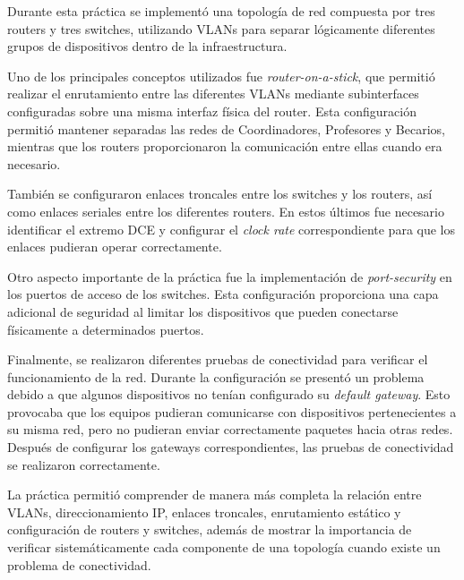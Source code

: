 \documentclass[12pt]{article}
\begin{document}
Durante esta práctica se implementó una topología de red compuesta por tres
routers y tres switches, utilizando VLANs para separar lógicamente diferentes
grupos de dispositivos dentro de la infraestructura.

Uno de los principales conceptos utilizados fue \textit{router-on-a-stick},
que permitió realizar el enrutamiento entre las diferentes VLANs mediante
subinterfaces configuradas sobre una misma interfaz física del router. Esta
configuración permitió mantener separadas las redes de Coordinadores,
Profesores y Becarios, mientras que los routers proporcionaron la
comunicación entre ellas cuando era necesario.

También se configuraron enlaces troncales entre los switches y los routers,
así como enlaces seriales entre los diferentes routers. En estos últimos fue
necesario identificar el extremo DCE y configurar el \textit{clock rate}
correspondiente para que los enlaces pudieran operar correctamente.

Otro aspecto importante de la práctica fue la implementación de
\textit{port-security} en los puertos de acceso de los switches. Esta
configuración proporciona una capa adicional de seguridad al limitar los
dispositivos que pueden conectarse físicamente a determinados puertos.

Finalmente, se realizaron diferentes pruebas de conectividad para verificar
el funcionamiento de la red. Durante la configuración se presentó un
problema debido a que algunos dispositivos no tenían configurado su
\textit{default gateway}. Esto provocaba que los equipos pudieran
comunicarse con dispositivos pertenecientes a su misma red, pero no pudieran
enviar correctamente paquetes hacia otras redes. Después de configurar los
gateways correspondientes, las pruebas de conectividad se realizaron
correctamente.

La práctica permitió comprender de manera más completa la relación entre
VLANs, direccionamiento IP, enlaces troncales, enrutamiento estático y
configuración de routers y switches, además de mostrar la importancia de
verificar sistemáticamente cada componente de una topología cuando existe un
problema de conectividad.
\end{document}

